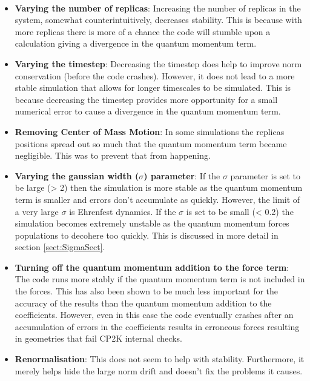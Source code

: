 \\
\begin{itemize}
	\item \textbf{Varying the number of replicas}: Increasing the number of replicas in the system, somewhat counterintuitively, decreases stability. This is because with more replicas there is more of a chance the code will stumble upon a calculation giving a divergence in the quantum momentum term.
	\item \textbf{Varying the timestep}: Decreasing the timestep does help to improve norm conservation (before the code crashes). However, it does not lead to a more stable simulation that allows for longer timescales to be simulated. This is because decreasing the timestep provides more opportunity for a small numerical error to cause a divergence in the quantum momentum term.
	\item \textbf{Removing Center of Mass Motion}: In some simulations the replicas positions spread out so much that the quantum momentum term became negligible. This was to prevent that from happening.
	\item \textbf{Varying the gaussian width ($\sigma$) parameter}: If the $\sigma$ parameter is set to be large (> 2) then the simulation is more stable as the quantum momentum term is smaller and errors don't accumulate as quickly. However,  the limit of a very large $\sigma$ is Ehrenfest dynamics. If the $\sigma$ is set to be small (< 0.2) the simulation becomes extremely unstable as the quantum momentum forces populations to decohere too quickly. This is discussed in more detail in section \ref{sect:SigmaSect}.
	\item \textbf{Turning off the quantum momentum addition to the force term}: The code runs more stably if the quantum momentum term is not included in the forces. This has also been shown to be much less important for the accuracy of the results than the quantum momentum addition to the coefficients. However, even in this case the code eventually crashes after an accumulation of errors in the coefficients results in erroneous forces resulting in geometries that fail CP2K internal checks.
	\item \textbf{Renormalisation}: This does not seem to help with stability. Furthermore, it merely helps hide the large norm drift and doesn't fix the problems it causes.
\end{itemize}

